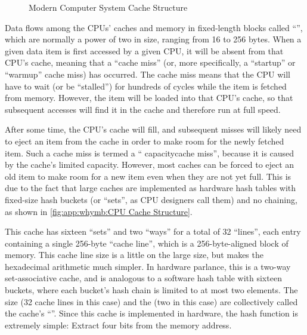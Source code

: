 \begin{figure}
\centering
{}
\caption{Modern Computer System Cache Structure}
\label{fig:app:whymb:Modern Computer System Cache Structure}
\end{figure}

Data flows among the CPUs' caches and memory in fixed-length blocks
called ``'', which are normally a power of two in size,
ranging from 16 to 256 bytes.
When a given data item is first accessed by a given CPU, it will
be absent from that CPU's cache, meaning that a ``cache miss''
(or, more specifically, a ``startup'' or ``warmup'' cache miss)
has occurred.
The cache miss means that the CPU will
have to wait (or be ``stalled'') for hundreds of cycles while the
item is fetched from memory.
However, the item will be loaded into that CPU's cache, so that
subsequent accesses will find it in the cache and therefore run
at full speed.

After some time, the CPU's cache will fill, and subsequent
misses will likely need to eject an item from the cache in order
to make room for the newly fetched item.
Such a cache miss is termed a ``
{capacity}{cache miss}'', because it is caused
by the cache's limited capacity.
However, most caches can be forced to eject an old item to make room
for a new item even when they are not yet full.
This is due to the fact that large caches are implemented as hardware
hash tables with fixed-size hash buckets (or ``sets'', as CPU designers
call them) and no chaining, as shown in
\cref{fig:app:whymb:CPU Cache Structure}.

This cache has sixteen ``sets'' and two ``ways'' for a total of 32
``lines'', each entry containing a single 256-byte ``cache line'',
which is a 256-byte-aligned block of memory.
This cache line size is a little on the large size, but makes the hexadecimal
arithmetic much simpler.
In hardware parlance, this is a two-way set-associative cache, and
is analogous to a software hash table with
sixteen buckets, where each bucket's hash chain is limited to
at most two elements.
The size (32 cache lines in this case) and the
 (two in
this case) are collectively called the cache's
``''.
Since this cache is implemented in hardware, the hash function is
extremely simple:
Extract four bits from the memory address.

